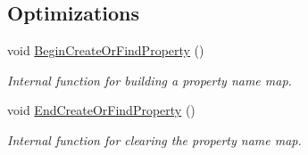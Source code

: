 \subsection*{Optimizations}
\begin{DoxyCompactItemize}
\item 
void \hyperlink{class_fbx_property_a9305ebb4cec09a9a9dea0a36f38e2712}{Begin\+Create\+Or\+Find\+Property} ()
\begin{DoxyCompactList}\small\item\em Internal function for building a property name map. \end{DoxyCompactList}\item 
void \hyperlink{class_fbx_property_a1af85e75268d31cb28323895ad45d52c}{End\+Create\+Or\+Find\+Property} ()
\begin{DoxyCompactList}\small\item\em Internal function for clearing the property name map. \end{DoxyCompactList}\end{DoxyCompactItemize}
